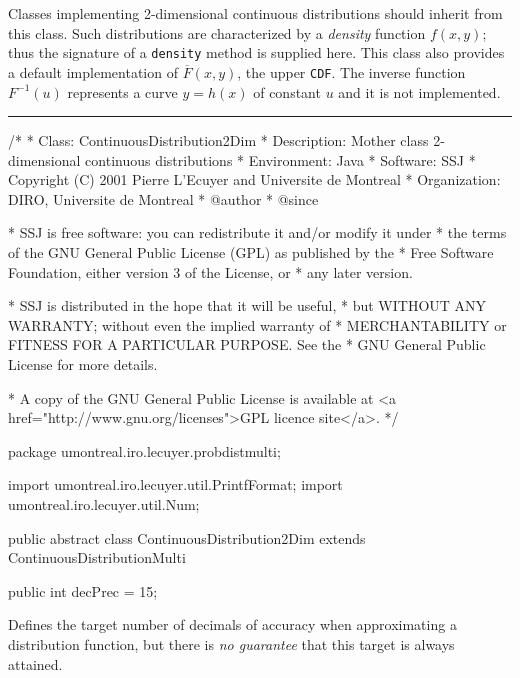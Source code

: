 
Classes implementing 2-dimensional continuous distributions should inherit 
from this class.
Such distributions are characterized by a \emph{density} function $f(x, y)$;
thus the signature of a \texttt{density} method is supplied here.
This class also provides a default implementation of $\overline F(x, y)$, 
the upper \texttt{CDF}. The inverse function $F^{-1}(u)$ represents a curve
$y = h(x)$ of constant $u$ and it is not implemented.

\bigskip\hrule

\begin{code}
\begin{hide}
/*
 * Class:        ContinuousDistribution2Dim
 * Description:  Mother class 2-dimensional continuous distributions
 * Environment:  Java
 * Software:     SSJ 
 * Copyright (C) 2001  Pierre L'Ecuyer and Universite de Montreal
 * Organization: DIRO, Universite de Montreal
 * @author       
 * @since

 * SSJ is free software: you can redistribute it and/or modify it under
 * the terms of the GNU General Public License (GPL) as published by the
 * Free Software Foundation, either version 3 of the License, or
 * any later version.

 * SSJ is distributed in the hope that it will be useful,
 * but WITHOUT ANY WARRANTY; without even the implied warranty of
 * MERCHANTABILITY or FITNESS FOR A PARTICULAR PURPOSE.  See the
 * GNU General Public License for more details.

 * A copy of the GNU General Public License is available at
   <a href="http://www.gnu.org/licenses">GPL licence site</a>.
 */
\end{hide}
package umontreal.iro.lecuyer.probdistmulti;
\begin{hide}
import umontreal.iro.lecuyer.util.PrintfFormat;
import umontreal.iro.lecuyer.util.Num;
\end{hide}

public abstract class ContinuousDistribution2Dim
                          extends ContinuousDistributionMulti\begin{hide} {\end{hide}

   public int decPrec = 15;
\end{code}
\begin{tabb} Defines the target number of decimals of accuracy when
 approximating a distribution function, but there is \emph{no guarantee} that
 this target is always attained.
\end{tabb}
